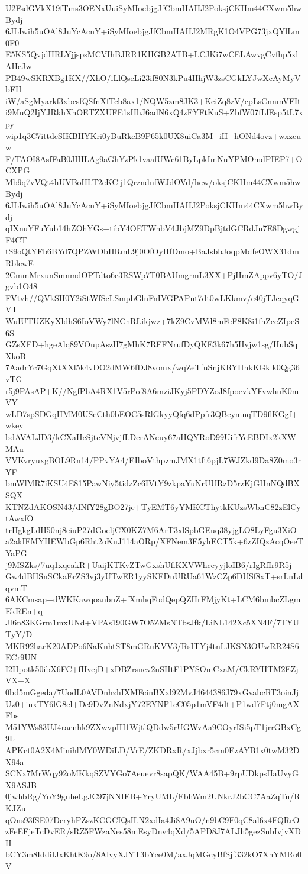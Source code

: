 U2FsdGVkX19fTms3OENxUuiSyMIoebjgJfCbmHAHJ2PoksjCKHm44CXwm5hwBydj
6JLIwih5uOAl8JuYcAcnY+iSyMIoebjgJfCbmHAHJ2MRgK1O4VPG73jxQYlLm0F0
E5KS5QvjdHRLYjjspsMCVIhBJRR1KHGB2ATB+LCJKi7wCELAwvgCvfhp5xlAHcJw
PB49wSKRXBg1KX//XhO/iLlQseLi23if80N3kPu4HhjW3zsCGkLYJwXcAyMyVbFH
iW/aSgMyarkf3xbcsfQSfnXfTcb8ax1/NQW5zm8JK3+KciZq8zV/cpLsCnnmVFIt
i9MuQ2IjYJRkhXhOETZXUFE1sHhJ6adN6xQ4zFYFtKuS+ZbfW07fLlEsp5tL7xpy
wip1q3C7ittdcSIKBHYKri0yBuRkcB9P65k0UX8uiCa3M+iH+hONd4ovz+wxzcuw
F/TAOI8AsfFaB0JIHLAg9aGhYzPk1vaafUWc61ByLpkImNuYPMOmdPIEP7+OCXPG
Mb9q7vVQt4hUVBoHLT2cKCij1QrzndnfWJdOVd/hew/oksjCKHm44CXwm5hwBydj
6JLIwih5uOAl8JuYcAcnY+iSyMIoebjgJfCbmHAHJ2PoksjCKHm44CXwm5hwBydj
qIXnuYFuYub14hZOhYGs+tibY4OETWnbV4JbjMZ9DpBjtdGCRdJn7E8DgwgjF4CT
tS9oQtYFb6BYd7QPZWDbHRmL9j0OfOyHfDmo+BaJsbbJoqpMdfeOWX31dmRblcwE
2CmmMrxunSmnmdOPTdto6c3RSWp7T0BAUmgrmL3XX+PjHmZAppv6yTO/Jgvb1O48
FVtvh//QVkSH0Y2iStWfScLSmpbGlnFnIVGPAPut7dt0wLKkmv/e40jTJcqyqGVT
WuIUTUZKyXldhS6IoVWy7lNCnRLikjwz+7kZ9CvMVd8mFeF8K8i1fhZccZIpeS6S
GZsXFD+hgeAlq89VOupAszH7gMhK7RFFNrufDyQKE3k67h5Hvjw1sg/HubSqXkoB
7AadrYc7GqXtXXl5k4vDO2dMW6fDJ8vomx/wqZeTfuSnjKRYHhkKGklk0Qg36vTG
r5j9PAsAP+K//NgfPbA4RX1V5rPof8A6mziJKyj5PDYZoJ8fpoevkYFvwhuK0mVY
wLD7spSDGqHMM0USeCth0bEOC5sRlGkyyQfq6dPpfr3QBeymnqTD9flKGgf+wkey
bdAVALJD3/kCXaHcSjtcVNjvjfLDerANeuy67aHQYRoD99UifrYeEBDIx2kXWMAu
VVKvryuxgBOL9Rn14/PPvYA4/EIboVthpzmJMX1tft6pjL7WJZkd9Da8Z0mo3rYF
bmWlMR7iKSU4E815PawNiy5tidzZc6IVtY9zkpaYuNrUURzD5rzKjGHnNQdBXSQX
KTNZdAKOSN43/dNfY28gBO27je+TyEMT6yYMKCThytkKUzsWbnC82zElCytAwxfO
trHgkgLdH50nj8eiuP27dGoeljCX0KZ7M6ArT3xlSpbGEuq38yjgLO8LyFgu3XiO
a2akIFMYHEWbGp6Rht2oKuJ114aORp/XFNem3E5yhECT5k+6zZIQzAcqOeeTYaPG
j9MSZks/7uq1xqeakR+UaijKTKvZTwGxshUfiKXVWhceyyjloIB6/rIgRfIr9R5j
Gw4dBHSnSCkaErZS3vj3yUTwER1yySKFDuURUa61WzCZp6DUSf8xT+srLnLdqvmT
6AKCmsap+dWKKawqoanbnZ+fXmhqFodQepQZHrFMjyKt+LCM6bmbcZLgmEkREn+q
JI6n83KGrm1mxUNd+VPAs190GW7O5ZMsNTbsJfk/LiNL142Xc5XN4F/7TYUTyY/D
MKR92harK20ADPo6NaKnhtST8mGRuKVV3/RsITYj4tnLJKSN3OUwRR24S6ECr9UN
I2Hpotk50ibX6FC+fHvejD+xDBZrsnev2nSHtF1PYSOmCxaM/CkRYHTM2EZjVX+X
0bd5mGgeda/7UodL0AVDnhzhIXMFcinBXxl92MvJ4644386J79xGvabcRT3oinJj
Uz0+inxTY6lG8el+Dc9DvZnNdxjY72EYNP1cC05p1mVF4dt+P1wd7Ftj0mgAXFbs
M51YWs83UJ4racnhk9ZXwvpIH1WjtlQDdw5rUGWvAa9COyrISi5pT1jrrGBxCg9L
APKct0A2X4MinihlMY0WDiLD/VrE/ZKDRxR/xJjbxr5cm0EzAYB1x0twM32DX94a
SCNx7MrWqy92oMKkqSZVYGo7Aeuevr8sapQK/WAA45B+9rpUDkpsHaUvyGX9ASJB
0jwhbRg/YoY9gnheLgJC97jNNIEB+YryUML/FbhWm2UNkrJ2bCC7AaZqTu/RKJZu
qOns93fSE07DcryhPZszKCGCIQsILN2xdIa4Ji8A9uO/n9bC9F0qC8al6x4FQRrO
zFeEFjeTcDvER/sRZ5FWzaNes58mEsyDnv4qXd/5APD8J7ALJh5gezSnbIvjvXDH
bCY3m8IddiIJxKhtK9o/8AlvyXJYT3bYce0M/axJqMGcyBfSjf332kO7XhYMRo0V
